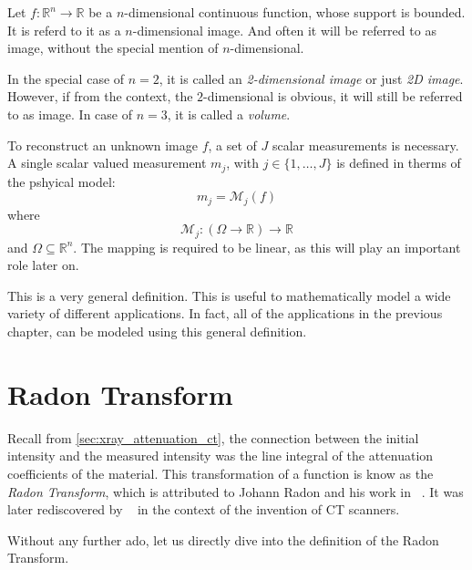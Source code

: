 \begin{definition}[Image]\label{def:image}
	Let \(f\colon \mathbb{R}^n \to \mathbb{R}\) be a \(n\)-dimensional continuous function,
	whose support is bounded. It is referd to it as a \(n\)-dimensional image. And often it will
	be referred to as image, without the special mention of \(n\)-dimensional.
\end{definition}


In the special case of \(n=2\), it is called an \textit{2-dimensional image} or just
\textit{2D image}. However, if from the context, the \(2\)-dimensional is obvious, it will still be
referred to as image. In case of \(n=3\), it is called a \textit{volume}.

\begin{definition}\label{def:forward-model}
	To reconstruct an unknown image \(f\), a set of \(J\) scalar measurements is necessary.
	A single scalar valued measurement \(m_j\), with \(j \in \{1, \dots, J\}\) is defined in therms
	of the pshyical model:
	\[ m_j = \mathscr{M}_j(f)\]
	where
	\[ \mathscr{M}_j\colon (\Omega \to \mathbb{R}) \to \mathbb{R} \]
	and \(\Omega \subseteq \mathbb{R}^n\). The mapping is required to be linear, as this will play an
	important role later on.
\end{definition}

This is a very general definition. This is useful to mathematically model a wide variety of
different applications. In fact, all of the applications in the previous chapter, can be modeled
using this general definition.

\section{Radon Transform}\label{sec:radon_transform}

Recall from \autoref{sec:xray_attenuation_ct}, the connection between the initial intensity and the
measured intensity was the line integral of the attenuation coefficients of the material. This
transformation of a function is know as the \textit{Radon Transform}, which is attributed to Johann
Radon and his work in \citeyear{radon_uber_1917}~\cite{radon_uber_1917,radon_determination_1986}. It
was later rediscovered by
\citeauthor{cormack_representation_1963}~\cite{cormack_representation_1963} in the context of the
invention of CT scanners.

Without any further ado, let us directly dive into the definition of the Radon Transform.

